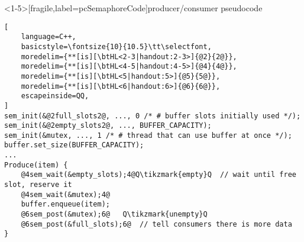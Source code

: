\begin{frame}<1-5>[fragile,label=pcSemaphoreCode]{producer/consumer pseudocode}
\begin{lstlisting}[
    language=C++,
    basicstyle=\fontsize{10}{10.5}\tt\selectfont,
    moredelim={**[is][\btHL<2-3|handout:2-3>]{@2}{2@}},
    moredelim={**[is][\btHL<4-5|handout:4-5>]{@4}{4@}},
    moredelim={**[is][\btHL<5|handout:5>]{@5}{5@}},
    moredelim={**[is][\btHL<6|handout:6>]{@6}{6@}},
    escapeinside=QQ,
]
sem_init(&@2full_slots2@, ..., 0 /* # buffer slots initially used */);
sem_init(&@2empty_slots2@, ..., BUFFER_CAPACITY);
sem_init(&mutex, ..., 1 /* # thread that can use buffer at once */);
buffer.set_size(BUFFER_CAPACITY);
...
Produce(item) {
    @4sem_wait(&empty_slots);4@Q\tikzmark{empty}Q  // wait until free slot, reserve it
    @4sem_wait(&mutex);4@
    buffer.enqueue(item);
    @6sem_post(&mutex);6@   Q\tikzmark{unempty}Q
    @6sem_post(&full_slots);6@  // tell consumers there is more data
}


\end{lstlisting}
\end{frame}
